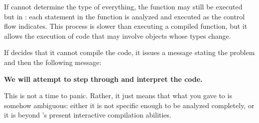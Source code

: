If \Language{} cannot determine the type of everything, the
function may still be executed
but
in  :
each statement in the function is analyzed and executed as the control
flow indicates.
This process is slower than executing a compiled function, but it
allows the execution of code that may involve objects whose types
change.

\beginImportant
If \Language{} decides that it cannot compile the code, it
issues a message stating the problem and then the following
message:
%
\begin{center}
{\bf We will attempt to step through and interpret the code.}
\end{center}
%
This is not a time to panic.
Rather, it just means that what you gave to \Language{}
is somehow ambiguous: either it is not specific enough to be analyzed
completely, or it is beyond \Language{}'s present interactive
compilation abilities.
\endImportant

